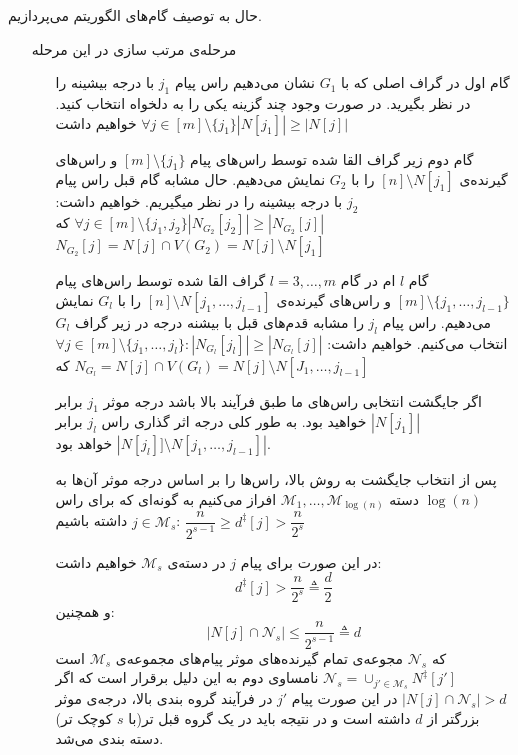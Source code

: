 حال به توصیف گام‌های الگوریتم می‌پردازیم.
\begin{itemize}
	\item[مرحله‌ی مرتب سازی] 
	در این مرحله
		\begin{enumerate}
			\item [گام اول]
			در گراف اصلی که با
			$G_1$
			نشان می‌دهیم راس پیام
			$j_1$
			با درجه بیشینه را در نظر بگیرید. در صورت وجود چند گزینه یکی را به دلخواه انتخاب کنید. خواهیم داشت
			$\forall j \in [m] \setminus \{j_1\} |N[j_1]| \geq |N[j]|$
			\item [گام دوم]
			زیر گراف القا شده توسط راس‌های پیام
			$[m] \setminus \{j_1\}$
			و راس‌های گیرنده‌ی
			$[n] \setminus N[j_1]$
			را با
		   $G_2$
		   نمایش می‌دهیم. حال مشابه گام قبل راس پیام
		   $j_2$
		   با درجه بیشینه را در نظر میگیریم. خواهیم داشت:
		   $\forall j \in [m] \setminus \{j_1, j_2\} |N_{G_2}[j_2]| \geq |N_{G_2}[j]|$
		   که
		   $N_{G_2}[j] = N[j] \cap V(G_2) = N[j] \setminus N[j_1]$
			\item [
			گام 
			$l$
			ام
			]
			در گام
			$l = 3, \ldots, m$
			گراف القا شده توسط راس‌های پیام
			$[m] \setminus \{j_1, \ldots, j_{l - 1}\}$
			و راس‌های گیرنده‌ی
			$[n] \setminus N[j_1, \ldots, j_{l-1} ]$
			را با
			$G_l$
			نمایش می‌دهیم. راس پیام
			$j_l$
			را مشابه قدم‌های قبل با بیشنه درجه در زیر گراف
			$G_l$
			 انتخاب می‌کنیم. خواهیم داشت:
			 $\forall j \in [m] \setminus \{j_1, \ldots, j_l\}: |N_{G_l}[j_l]| \geq |N_{G_l} [j]|$
			 که
			 $N_{G_l} = N[j] \cap V(G_l) = N[j] \setminus N[J_1, \ldots, j_{l - 1}] $
			
			اگر جایگشت انتخابی راس‌های ما طبق فرآیند بالا باشد درجه موثر 
			$j_1$
			برابر
			$|N[j_1]|$
			 خواهید بود. به طور کلی درجه اثر گذاری راس
			 $j_l$
			 برابر
			 $|N[j_l]]\setminus N[j_1, \ldots, j_{l-1}]|$
			 خواهد بود.
			 
			 پس از انتخاب جایگشت به روش بالا، راس‌ها را بر اساس درجه موثر آن‌ها به
			 $\log(n)$
			 دسته 
			 $\mathcal{M}_1, \ldots, \mathcal{M}_{\log(n)}$
			 افراز می‌کنیم به گونه‌ای که برای راس
			 $j \in \mathcal{M}_s$
			 داشته باشیم:
			 $\dfrac{n}{2^{s - 1}} \geq d^\ddagger[j] > \dfrac{n}{2^s}$
			 
			 در این صورت برای پیام
			 $j$
			 در دسته‌ی
			 $\mathcal{M}_s$
			 خواهیم داشت:
			 $$d^{\ddagger}[j] > \dfrac{n}{2^s} \triangleq \dfrac{d}{2}$$
			 و همچنین:
			 $$|N[j] \cap \mathcal{N}_s| \leq \dfrac{n}{2^{s - 1}} \triangleq d$$
			 که
			 $\mathcal{N}_s$
			 مجوعه‌ی تمام گیرنده‌های موثر پیام‌های مجموعه‌ی
			 $\mathcal{M}_s$
			 است
			 $\mathcal{N}_s = \cup_{j' \in \mathcal{M}_s} N^{\ddagger}[j']$
			 نامساوی دوم به این دلیل برقرار است که اگر
			 $|N[j] \cap \mathcal{N}_s | > d$
			 در این صورت پیام
			 $j'$
			 در فرآیند گروه بندی بالا، درجه‌ی موثر بزرگتر از
			 $d$
			 داشته است و در نتیجه باید در یک گروه قبل تر(با
			 $s$
			 کوچک تر) دسته بندی می‌شد.
			 

\end{enumerate}
\end{itemize}
